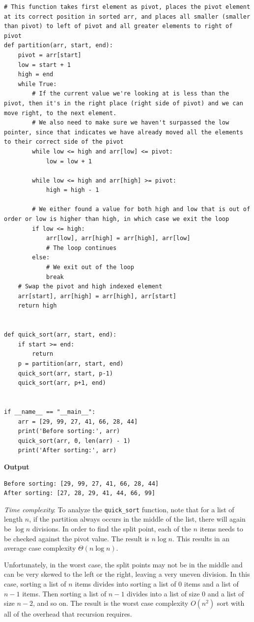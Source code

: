 \documentclass[a4paper,11pt]{book}
\begin{document}
\begin{lstlisting}
# This function takes first element as pivot, places the pivot element at its correct position in sorted arr, and places all smaller (smaller than pivot) to left of pivot and all greater elements to right of pivot 
def partition(arr, start, end):
    pivot = arr[start]
    low = start + 1
    high = end
    while True:
        # If the current value we're looking at is less than the pivot, then it's in the right place (right side of pivot) and we can move right, to the next element. 
        # We also need to make sure we haven't surpassed the low pointer, since that indicates we have already moved all the elements to their correct side of the pivot
        while low <= high and arr[low] <= pivot:
            low = low + 1
        
        while low <= high and arr[high] >= pivot:
            high = high - 1

        # We either found a value for both high and low that is out of order or low is higher than high, in which case we exit the loop
        if low <= high:
            arr[low], arr[high] = arr[high], arr[low]
            # The loop continues
        else:
            # We exit out of the loop
            break
    # Swap the pivot and high indexed element
    arr[start], arr[high] = arr[high], arr[start]
    return high


def quick_sort(arr, start, end):
    if start >= end:
        return
    p = partition(arr, start, end)
    quick_sort(arr, start, p-1)
    quick_sort(arr, p+1, end)


if __name__ == "__main__":
    arr = [29, 99, 27, 41, 66, 28, 44]
    print('Before sorting:', arr)
    quick_sort(arr, 0, len(arr) - 1)
    print('After sorting:', arr)
\end{lstlisting}
\textbf{Output}
\begin{lstlisting}
Before sorting: [29, 99, 27, 41, 66, 28, 44]
After sorting: [27, 28, 29, 41, 44, 66, 99]
\end{lstlisting}

\noindent \textit{Time complexity}: To analyze the \lstinline{quick_sort} function, note that for a list of length $n$, if the partition always occurs in the middle of the list, there will again be $\log n$ divisions. In order to find the split point, each of the $n$ items needs to be checked against the pivot value. The result is $n\log n$. This results in an average case complexity $\Theta(n\log n)$.

\noindent Unfortunately, in the worst case, the split points may not be in the middle and can be very skewed to the left or the right, leaving a very uneven division. In this case, sorting a list of $n$ items divides into sorting a list of 0 items and a list of $n-1$ items. Then sorting a list of $n-1$ divides into a list of size 0 and a list of size $n-2$, and so on. The result is the worst case complexity $O(n^2)$ sort with all of the overhead that recursion requires.
\end{document}
